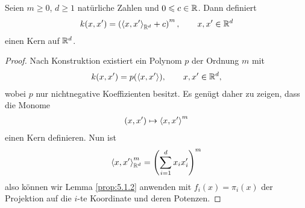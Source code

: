 \begin{lem}
\label{prop:5.1.6}
Seien $m\ge 0$, $d\ge 1$ natürliche Zahlen und $0 \leqslant c \in\mathbb{R}$. Dann definiert
\begin{align*}
k(x,x') = \left(\left\langle x,x'\right\rangle_{\mathbb{R}^d} + c\right)^m,\qquad x,x'\in \mathbb{R}^d
\end{align*}
einen Kern auf $\mathbb{R}^d$.\fishhere
\end{lem}
\begin{proof}
Nach Konstruktion existiert ein Polynom $p$ der Ordnung $m$ mit
\begin{align*}
k(x,x') = p(\left\langle x,x'\right\rangle),\qquad x,x'\in \mathbb{R}^d,
\end{align*}
wobei $p$ nur nichtnegative Koeffizienten besitzt. Es genügt daher zu zeigen,
dass die Monome
\begin{align*}
(x,x') \mapsto \left\langle x,x'\right\rangle^m
\end{align*}
einen Kern definieren. Nun ist
\begin{align*}
\left\langle x,x'\right\rangle_{\mathbb{R}^d}^m = \left(\sum_{i=1}^d x_ix_i' \right)^m
\end{align*}
also können wir Lemma \ref{prop:5.1.2} anwenden mit $f_i(x) = \pi_i(x)$ der
Projektion auf die $i$-te Koordinate und deren Potenzen.\qedhere
\end{proof}

